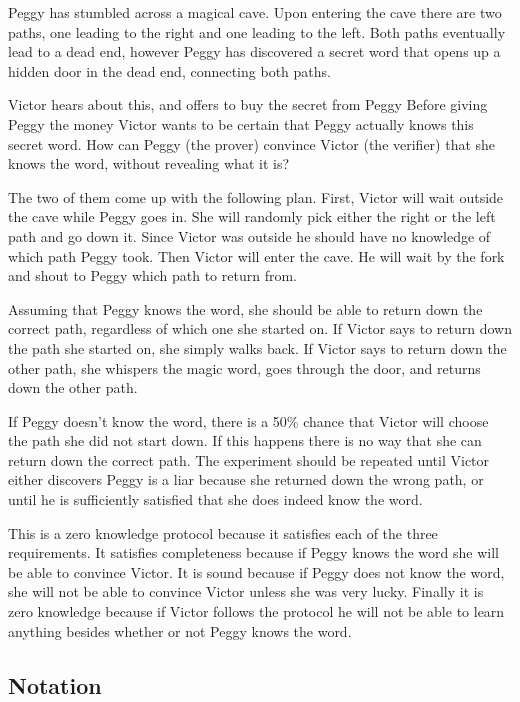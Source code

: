\documentclass{sig-alternate}
\begin{document}
	Peggy has stumbled across a magical cave. Upon entering the cave
	there are two paths, one leading to the right and one leading to the
	left. Both paths eventually lead to a dead end, however Peggy has
	discovered a secret word that opens up a hidden door in the dead end,
	connecting both paths.

	Victor hears about this, and offers to buy the secret from Peggy
	Before giving Peggy the money Victor
	wants to be certain that Peggy actually knows this secret word. How can
	Peggy (the prover) convince Victor (the verifier) that she knows the
	word, without revealing what it is?

	The two of them come up with the following plan. First, Victor will wait
	outside the cave while Peggy goes in. She will randomly pick either the
	right or the left path and go down it. Since Victor was outside he
	should have no knowledge of which path Peggy took. Then Victor will
	enter the cave. He will wait by the fork and shout to Peggy which
	path to return from. 
	
	Assuming that Peggy knows the word, she should be able to return down
	the correct path, regardless of which one she started on. If Victor 
	says to	return down the path she started on, she simply walks back. 
	If Victor says to return down the other path, she whispers the magic
	word, goes through the door, and returns down the other path.

	If Peggy doesn't know the word, there is a 50\% chance that Victor
	will choose the path she did not start down. If this happens there is
	no way that she can return down the correct path. The experiment should
	be repeated until Victor either discovers Peggy is a liar because she
	returned down the wrong path, or until he is sufficiently satisfied
	that she does indeed know the word.

	This is a zero knowledge protocol because it satisfies each of the three
	requirements. It satisfies completeness because	if Peggy knows the word
	she will be able to convince Victor. It is sound because if Peggy does not 
	know the word, she will not be able to convince Victor unless she was very
	lucky. Finally it is zero knowledge because if Victor follows the protocol
	he will not be able to learn anything besides whether or not Peggy knows 
	the word.
	
	\subsection{Notation}
\end{document}
